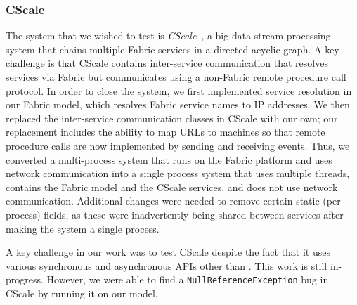 \subsubsection{CScale}
The system that we wished to test is \emph{CScale}~\cite{X},
a big data-stream processing system that chains multiple Fabric services
in a directed acyclic graph.
A key challenge is that
CScale contains inter-service communication
that resolves services
via Fabric but communicates
using a non-Fabric remote procedure call protocol.
In order to close the system,
we first implemented service resolution in our Fabric model,
which resolves Fabric service names to IP addresses.
We then replaced the inter-service communication
classes in CScale with our own;
our replacement includes the ability to map
URLs to \psharp{} machines
so that remote procedure calls are now implemented
by sending and receiving \psharp{} events.
Thus,
we converted a multi-process system
that runs on the Fabric platform
and 
uses network communication
into 
a single process system that uses multiple threads,
contains
the Fabric model
and the CScale services,
and does not use network communication.
Additional changes were needed to
remove certain static (per-process) fields,
as these were inadvertently
being shared between services
after making the system a single process.

A key challenge in our work
was to test CScale despite the fact that it
uses various synchronous and asynchronous APIs
other than \psharp{}.
This work is still in-progress.
However,
we were able to find a \texttt{NullReferenceException}
bug
in CScale
by running it on our model.











